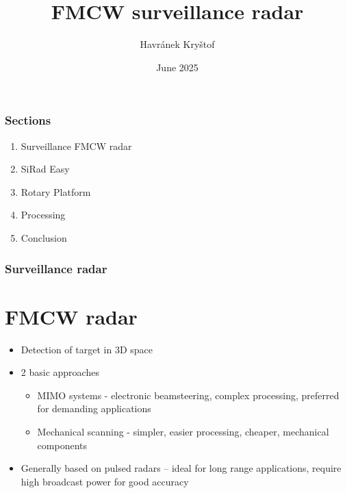 \documentclass[aspectratio=43]{beamer}
\title{FMCW surveillance radar}
\author{Havránek Kryštof}
\date{June 2025}
\institute{České vysoké učení technické v Praze}
\begin{document}
\begin{frame}[plain]
  \maketitle
\end{frame}

\clearpage
\setcounter{framenumber}{0}

\begin{frame}[fragile]
  \frametitle{Sections}

  \begin{enumerate}
    \item Surveillance FMCW radar
    \item SiRad Easy
    \item Rotary Platform
    \item Processing
    \item Conclusion
  \end{enumerate}
\end{frame}


\begin{frame}[fragile]
  \frametitle{Surveillance radar}
  \section{FMCW radar}

  \begin{itemize}
    \item Detection of target in 3D space
    \item 2 basic approaches
      \begin{itemize}
        \item MIMO systems - electronic beamsteering, complex processing, preferred for demanding applications
        \item Mechanical scanning - simpler, easier processing, cheaper, mechanical components
      \end{itemize}
    \item Generally based on pulsed radars -- ideal for long range applications, require high broadcast power for good accuracy
  \end{itemize}
\end{frame}
\end{document}
